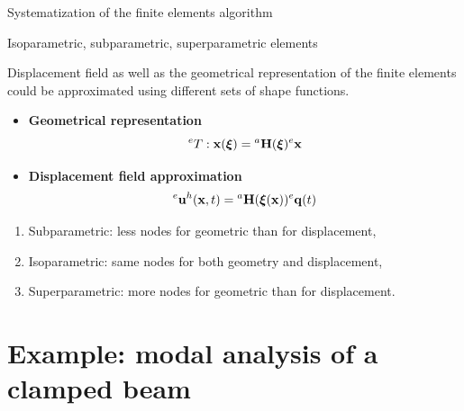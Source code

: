 \documentclass[aspectratio=169]{beamer}
\begin{document}
\begin{frame}{Systematization of the finite elements algorithm}
\end{frame}

\begin{frame}{Isoparametric, subparametric, superparametric elements}
  \begin{block}{}
    Displacement field as well as the geometrical representation of the finite elements could be approximated using different sets of shape functions.
  \end{block}
  \begin{itemize}
    \item \textbf{Geometrical representation}
          $$
            {}^eT : \mathbf x(\boldsymbol\xi)={}^a\mathbf H(\boldsymbol\xi) ^e{} \mathbf x
          $$
    \item  \textbf{Displacement field approximation}
          $$
            {}^e\mathbf u^{h}(\mathbf x,t)={}^a\mathbf H(\boldsymbol\xi(\mathbf x)){}^e\mathbf q(t)
          $$
  \end{itemize}
  \begin{enumerate}
    \item Subparametric: less nodes for geometric than for displacement,
    \item Isoparametric: same nodes for both geometry and displacement,
    \item Superparametric: more nodes for geometric than for displacement.
  \end{enumerate}
\end{frame}

\section{Example: modal analysis of a clamped beam}
\end{document}
